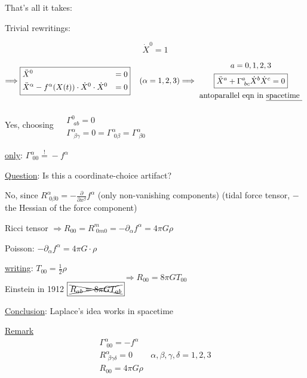 \documentclass[10pt]{amsart}
\begin{document}
\begin{multicols*}{2}
	That's all it takes:
	
	Trivial rewritings:
	
	\[
	\dot{X}^0 =1
	\]
	
	\[
	\Longrightarrow \boxed{ \begin{aligned}
		& \ddot{X}^0 & = 0 \\ 
		& \ddot{X}^{\alpha} - f^{\alpha}(X(t))\cdot \dot{X}^0 \cdot \dot{X}^0 & =0 
		\end{aligned} } \quad \, (\alpha = 1,2,3)  \Longrightarrow \begin{gathered}
	a = 0,1,2,3 \\
	\boxed{ \ddot{X}^a + \Gamma^a_{ \, \, bc}\dot{X}^b \dot{X}^c = 0 } \\
	\text{ antoparallel eqn in \underline{spacetime } }
	\end{gathered}
	\]
	
	Yes, choosing $\begin{aligned} & \quad \\
	& \Gamma^0_{ \, \, ab} = 0 \\
	& \Gamma^{\alpha}_{ \, \, \beta \gamma} = 0 =\Gamma^{\alpha}_{\,\, 0\beta} = \Gamma^{\alpha}_{ \, \, \beta 0}\end{aligned}$
	
	\underline{only}: $\boxed{ \Gamma^{\alpha}_{ \, \, 00} \overset{!}{=} -f^{\alpha}}$
	
	\underline{Question}: Is this a coordinate-choice artifact?
	
	No, since $R^{\alpha}_{ \, \, 0\beta 0} = - \frac{ \partial }{ \partial x^{\beta}} f^{\alpha}$ (only non-vanishing components) (tidal force tensor, $-$ the Hessian of the force component)
	
	Ricci tensor $\Longrightarrow  R_{00} = R^m_{ \, \, 0m0} = -\partial_{\alpha} f^{\alpha} = 4\pi G \rho$
	
	Poisson: $-\partial_{\alpha}f^{\alpha} = 4\pi G\cdot \rho$
	
	\underline{writing}: $T_{00} = \frac{1}{2} \rho$ 
	\[
	\Longrightarrow \boxed{ R_{00} = 8 \pi G T_{00} }
	\]
	Einstein in 1912 $ \boxed{ \xcancel{ R_{ab} = 8\pi G T_{ab} }}$
	
	
	\underline{Conclusion}: Laplace's idea works in spacetime
	
	\underline{Remark} 
	\[
	\begin{gathered}
	\Gamma^{\alpha}_{ \, \, 00 } = -f^{\alpha} \\ 
	R^{\alpha}_{ \, \, \beta \gamma \delta } = 0 \quad \quad \, \alpha, \beta , \gamma, \delta = 1,2,3 \\
	\boxed{ R_{00} = 4\pi G \rho }
	\end{gathered}
	\]
	

\end{multicols*}
\end{document}
